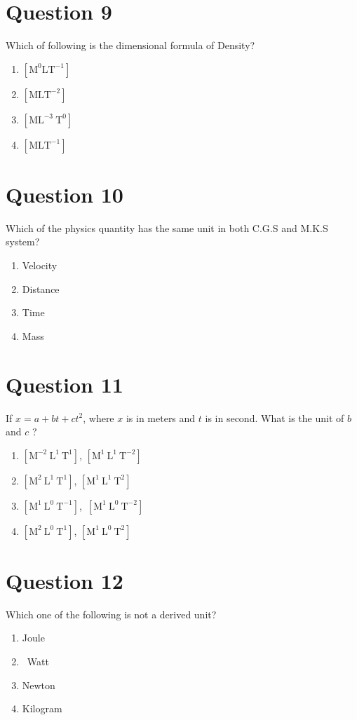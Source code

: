 \documentclass{article}
\begin{document}
\section*{Question 9}
Which of following is the dimensional formula of Density?
\begin{enumerate}[label=(\alph*)]
\item \(\left[\mathrm{M}^{0} \mathrm{LT}^{-1}\right]\)
\item \(\left[\mathrm{MLT}^{-2}\right]\)
\item \(\left[\mathrm{ML}^{-3} \mathrm{~T}^{0}\right]\)
\item \(\left[\mathrm{MLT}^{-1}\right]\)
\end{enumerate}
\newpage
\section*{Question 10}
Which of the physics quantity has the same unit in both C.G.S and M.K.S system?
\begin{enumerate}[label=(\alph*)]
\item Velocity
\item Distance
\item Time
\item Mass
\end{enumerate}
\newpage
\section*{Question 11}
If \(x=a+b t+c t^{2}\), where \(x\) is in meters and \(t\) is in second. What is the unit of \(b\) and \(c\) ?
\begin{enumerate}[label=(\alph*)]
\item \(\left[\mathrm{M}^{-2} \mathrm{~L}^{1} \mathrm{~T}^{1}\right]\), \(\left[\mathrm{M}^{1} \mathrm{~L}^{1} \mathrm{~T}^{-2}\right]\)
\item \(\left[\mathrm{M}^{2} \mathrm{~L}^{1} \mathrm{~T}^{1}\right]\), \(\left[\mathrm{M}^{1} \mathrm{~L}^{1} \mathrm{~T}^{2}\right]\)
\item \(\left[\mathrm{M}^{1} \mathrm{~L}^{0} \mathrm{~T}^{-1}\right]\), \(\left[\mathrm{M}^{1} \mathrm{~L}^{0} \mathrm{~T}^{-2}\right]\)
\item \(\left[\mathrm{M}^{2} \mathrm{~L}^{0} \mathrm{~T}^{1}\right]\), \(\left[\mathrm{M}^{1} \mathrm{~L}^{0} \mathrm{~T}^{2}\right]\)
\end{enumerate}
\newpage
\section*{Question 12}
Which one of the following is not a derived unit?
\begin{enumerate}[label=(\alph*)]
\item Joule
\item  Watt
\item Newton
\item Kilogram
\end{enumerate}
\newpage
\end{document}
